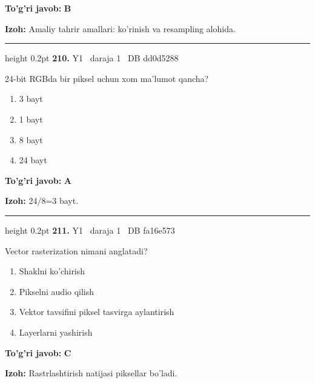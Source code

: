 \documentclass[10pt,a4paper,oneside]{article}
\begin{document}
\begin{tcolorbox}[enhanced,breakable,colback=teal!4,colframe=teal!45!black,boxrule=0.45pt,arc=1.2mm,left=2.8mm,right=2.8mm,top=2mm,bottom=2mm,before skip=2mm,after skip=2mm]
\textbf{\color{teal}To'g'ri javob:} \textbf{B}
\par\smallskip
\textbf{Izoh:} Amaliy tahrir amallari: ko'rinish va resampling alohida.
\end{tcolorbox}
\vspace{2mm}\hrule height 0.2pt \vspace{4mm}
\hypertarget{q210}{\textbf{\color{ink}210.}}  {\color{muted}\scriptsize Y1 \textbullet\ daraja 1 \textbullet\ DB dd0d5288}
\par
24-bit RGBda bir piksel uchun xom ma'lumot qancha?
\begin{enumerate}[label=\Alph*),leftmargin=9mm]
\item 3 bayt
\item 1 bayt
\item 8 bayt
\item 24 bayt
\end{enumerate}
\begin{tcolorbox}[enhanced,breakable,colback=teal!4,colframe=teal!45!black,boxrule=0.45pt,arc=1.2mm,left=2.8mm,right=2.8mm,top=2mm,bottom=2mm,before skip=2mm,after skip=2mm]
\textbf{\color{teal}To'g'ri javob:} \textbf{A}
\par\smallskip
\textbf{Izoh:} 24/8=3 bayt.
\end{tcolorbox}
\vspace{2mm}\hrule height 0.2pt \vspace{4mm}
\hypertarget{q211}{\textbf{\color{ink}211.}}  {\color{muted}\scriptsize Y1 \textbullet\ daraja 1 \textbullet\ DB fa16e573}
\par
Vector rasterization nimani anglatadi?
\begin{enumerate}[label=\Alph*),leftmargin=9mm]
\item Shaklni ko'chirish
\item Pikselni audio qilish
\item Vektor tavsifini piksel tasvirga aylantirish
\item Layerlarni yashirish
\end{enumerate}
\begin{tcolorbox}[enhanced,breakable,colback=teal!4,colframe=teal!45!black,boxrule=0.45pt,arc=1.2mm,left=2.8mm,right=2.8mm,top=2mm,bottom=2mm,before skip=2mm,after skip=2mm]
\textbf{\color{teal}To'g'ri javob:} \textbf{C}
\par\smallskip
\textbf{Izoh:} Rastrlashtirish natijasi piksellar bo'ladi.
\end{tcolorbox}
\end{document}
